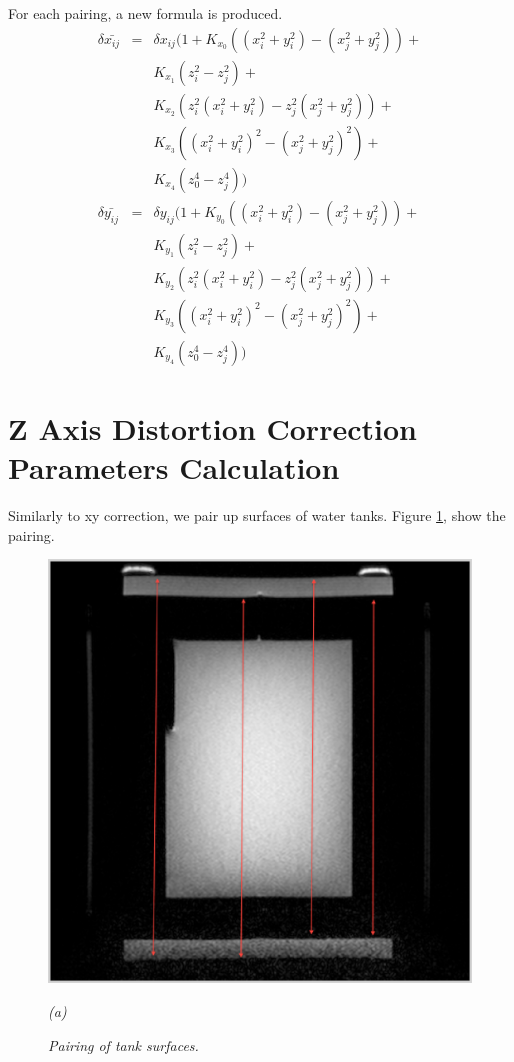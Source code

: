 For each pairing, a new formula is produced.
\begin{eqnarray} 
  \delta{\bar{x_{ij}}} & = & \delta{x_{ij}}(1 + K_{x_0}((x_i^2 + y_i^2) - (x_j^2 + y_j^2)) + \nonumber\\
  & & K_{x_1}(z_i^2 - z_j^2) + \nonumber\\
  & & K_{x_2}(z_i^2(x_i^2 + y_i^2)- z_j^2(x_j^2 + y_j^2)) + \nonumber\\
  & & K_{x_3}((x_i^2 + y_i^2)^2 - (x_j^2 + y_j^2)^2) + \nonumber\\
  & & K_{x_4}(z_0^4 - z_j^4)) \\
  \delta{\bar{y_{ij}}} & = & \delta{y_{ij}}(1 + K_{y_0}((x_i^2 + y_i^2) - (x_j^2 + y_j^2)) + \nonumber\\
  & & K_{y_1}(z_i^2 - z_j^2) + \nonumber\\
  & & K_{y_2}(z_i^2(x_i^2 + y_i^2)- z_j^2(x_j^2 + y_j^2)) + \nonumber\\
  & & K_{y_3}((x_i^2 + y_i^2)^2 - (x_j^2 + y_j^2)^2) + \nonumber\\
  & & K_{y_4}(z_0^4 - z_j^4))
\end{eqnarray}

\section{Z Axis Distortion Correction Parameters Calculation}

Similarly to xy correction, we pair up surfaces of water tanks. Figure \ref{fig:correction_surface_pairing}, 
show the pairing.

\begin{figure}[htb]
  \begin{minipage}[b]{0.8\linewidth}
    \centering
    \centerline{\mbox{\includegraphics[width=0.8\linewidth]{parameters/images/surface_pairing_z.eps}}}
    \centerline{\emph{(a)}}
  \end{minipage}
  \caption{\emph{Pairing of tank surfaces. }}
  \label{fig:correction_surface_pairing}
\end{figure}

